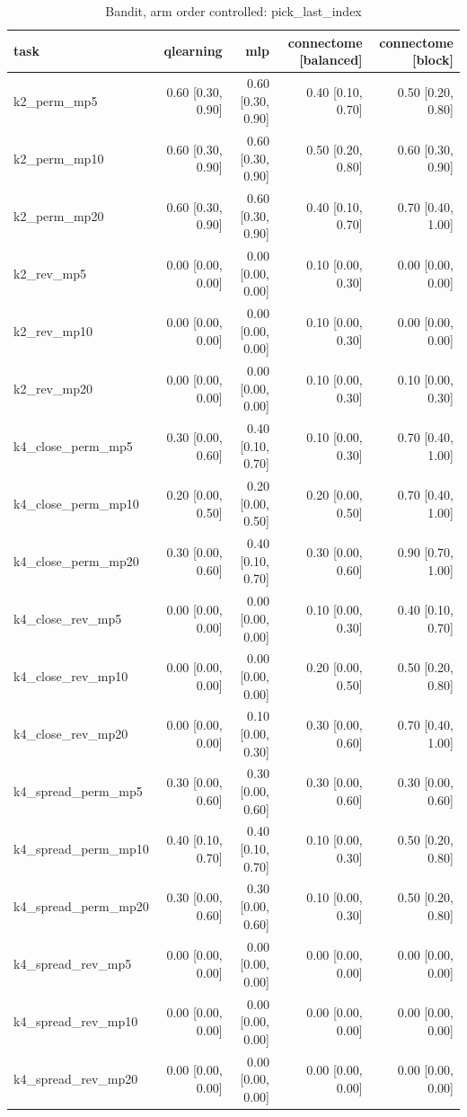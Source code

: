 \begin{table}[t]
\centering
\small
\begin{tabular}{lrrrr}
\toprule
task & qlearning & mlp & connectome [balanced] & connectome [block] \\
\midrule
k2\_perm\_mp5 & 0.60 [0.30, 0.90] & 0.60 [0.30, 0.90] & 0.40 [0.10, 0.70] & 0.50 [0.20, 0.80] \\
k2\_perm\_mp10 & 0.60 [0.30, 0.90] & 0.60 [0.30, 0.90] & 0.50 [0.20, 0.80] & 0.60 [0.30, 0.90] \\
k2\_perm\_mp20 & 0.60 [0.30, 0.90] & 0.60 [0.30, 0.90] & 0.40 [0.10, 0.70] & 0.70 [0.40, 1.00] \\
k2\_rev\_mp5 & 0.00 [0.00, 0.00] & 0.00 [0.00, 0.00] & 0.10 [0.00, 0.30] & 0.00 [0.00, 0.00] \\
k2\_rev\_mp10 & 0.00 [0.00, 0.00] & 0.00 [0.00, 0.00] & 0.10 [0.00, 0.30] & 0.00 [0.00, 0.00] \\
k2\_rev\_mp20 & 0.00 [0.00, 0.00] & 0.00 [0.00, 0.00] & 0.10 [0.00, 0.30] & 0.10 [0.00, 0.30] \\
k4\_close\_perm\_mp5 & 0.30 [0.00, 0.60] & 0.40 [0.10, 0.70] & 0.10 [0.00, 0.30] & 0.70 [0.40, 1.00] \\
k4\_close\_perm\_mp10 & 0.20 [0.00, 0.50] & 0.20 [0.00, 0.50] & 0.20 [0.00, 0.50] & 0.70 [0.40, 1.00] \\
k4\_close\_perm\_mp20 & 0.30 [0.00, 0.60] & 0.40 [0.10, 0.70] & 0.30 [0.00, 0.60] & 0.90 [0.70, 1.00] \\
k4\_close\_rev\_mp5 & 0.00 [0.00, 0.00] & 0.00 [0.00, 0.00] & 0.10 [0.00, 0.30] & 0.40 [0.10, 0.70] \\
k4\_close\_rev\_mp10 & 0.00 [0.00, 0.00] & 0.00 [0.00, 0.00] & 0.20 [0.00, 0.50] & 0.50 [0.20, 0.80] \\
k4\_close\_rev\_mp20 & 0.00 [0.00, 0.00] & 0.10 [0.00, 0.30] & 0.30 [0.00, 0.60] & 0.70 [0.40, 1.00] \\
k4\_spread\_perm\_mp5 & 0.30 [0.00, 0.60] & 0.30 [0.00, 0.60] & 0.30 [0.00, 0.60] & 0.30 [0.00, 0.60] \\
k4\_spread\_perm\_mp10 & 0.40 [0.10, 0.70] & 0.40 [0.10, 0.70] & 0.10 [0.00, 0.30] & 0.50 [0.20, 0.80] \\
k4\_spread\_perm\_mp20 & 0.30 [0.00, 0.60] & 0.30 [0.00, 0.60] & 0.10 [0.00, 0.30] & 0.50 [0.20, 0.80] \\
k4\_spread\_rev\_mp5 & 0.00 [0.00, 0.00] & 0.00 [0.00, 0.00] & 0.00 [0.00, 0.00] & 0.00 [0.00, 0.00] \\
k4\_spread\_rev\_mp10 & 0.00 [0.00, 0.00] & 0.00 [0.00, 0.00] & 0.00 [0.00, 0.00] & 0.00 [0.00, 0.00] \\
k4\_spread\_rev\_mp20 & 0.00 [0.00, 0.00] & 0.00 [0.00, 0.00] & 0.00 [0.00, 0.00] & 0.00 [0.00, 0.00] \\
\bottomrule
\end{tabular}
\caption{Bandit, arm order controlled: pick\_last\_index}
\label{tab:bandit_perm_pick_last_index}
\end{table}